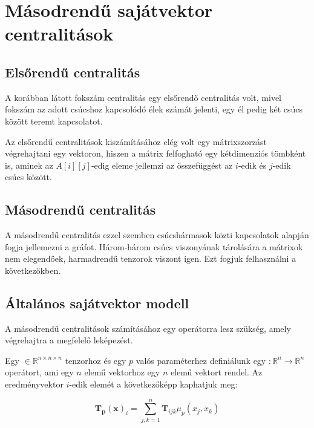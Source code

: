 \documentclass[12pt,numbers=noenddot]{report}
\begin{document}

\chapter{Másodrendű sajátvektor centralitások}


\section{Elsőrendű centralitás}

A korábban látott fokszám centralitás egy elsőrendő centralitás volt,
mivel fokszám az adott csúcshoz kapcsolódó élek számát jelenti,
egy él pedig két csúcs között teremt kapcsolatot. 

Az elsőrendű centralitások kiszámításához elég volt egy mátrixszorzást végrehajtani egy vektoron,
hiszen a mátrix felfogható egy kétdimenziós tömbként is, 
aminek az $A[i][j]$-edig eleme jellemzi az összefüggést az $i$-edik és $j$-edik csúcs között.


\section{Másodrendű centralitás}

A másodrendű centralitás ezzel szemben csúcshármasok közti kapcsolatok alapján fogja jellemezni a gráfot.
Három-három csúcs viszonyának tárolására a mátrixok nem elegendőek, harmadrendű tenzorok viszont igen.
Ezt fogjuk felhasználni a következőkben.


\section{Általános sajátvektor modell}

A másodrendű centralitások számításához egy operátorra lesz szükség, amely végrehajtra a megfelelő leképezést.

Egy \unboldmath $\in \mathbb{R}^{n \times n \times n}$ tenzorhoz és egy $p$ valós paraméterhez
definiálunk egy \unboldmath $: \mathbb{R}^n \rightarrow \mathbb{R}^n$ operátort,
ami egy $n$ elemű vektorhoz egy $n$ elemű vektort rendel. Az eredményvektor $i$-edik elemét a következőképp kaphatjuk meg:

$$\boldsymbol{T_p}(\boldsymbol{x})_i = \sum_{j,k=1}^n \boldsymbol{T}_{ijk} \mu_p(x_j,x_k)$$
\end{document}
